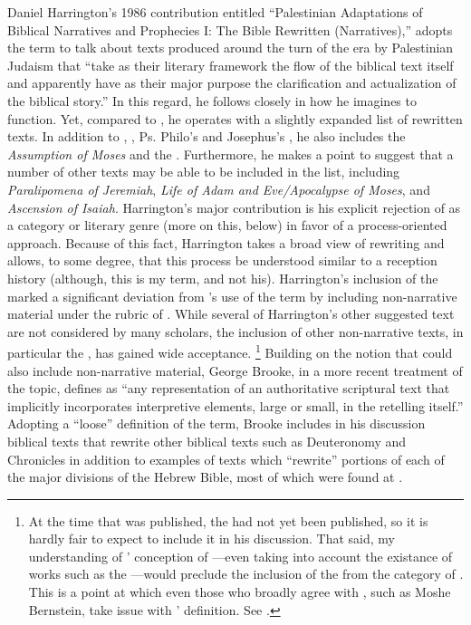 Daniel Harrington's 1986 contribution entitled ``Palestinian Adaptations of Biblical Narratives and Prophecies I: The Bible Rewritten (Narratives),'' adopts the term \rwb to talk about texts produced around the turn of the era by Palestinian Judaism that ``take as their literary framework the flow of the biblical text itself and apparently have as their major purpose the clarification and actualization of the biblical story.''\autocite[239]{harrington_kraft-nickelsburg1986} In this regard, he follows \vermes closely in how he imagines \rwb to function. Yet, compared to \vermes, he operates with a slightly expanded list of rewritten texts. In addition to \jub, \ga, Ps. Philo's \lab and Josephus's \ant, he also includes the \emph{Assumption of Moses} and the \templescroll. Furthermore, he makes a point to suggest that a number of other texts may be able to be included in the list, including \emph{Paralipomena of Jeremiah}, \emph{Life of Adam and Eve/Apocalypse of Moses}, and \emph{Ascension of Isaiah}. Harrington's major contribution is his explicit rejection of \rwb as a category or literary genre (more on this, below) in favor of a process-oriented approach. Because of this fact, Harrington takes a broad view of rewriting and allows, to some degree, that this process be understood similar to a reception history (although, this is my term, and not his). Harrington's inclusion of the \templescroll marked a significant deviation from \vermes's use of the term by including non-narrative material under the rubric of \rwb. While several of Harrington's other suggested text are not considered \rwb by many scholars, the inclusion of other non-narrative texts, in particular the \templescroll, has gained wide acceptance.%
%
\footnote{At the time that  was published, the \templescroll had not yet been published, so it is hardly fair to expect \vermes to include it in his discussion. That said, my understanding of \vermes' conception of \rwb---even taking into account the existance of works such as the \templescroll---would preclude the inclusion of the \templescroll from the category of \rwb. This is a point at which even those who broadly agree with \vermes, such as Moshe Bernstein, take issue with \vermes' definition. See \cite[TODO: pg]{bernstein_textus2005}.}
%
Building on the notion that \rwb could also include non-narrative material, George Brooke, in a more recent treatment of the topic, defines \rwb as ``any representation of an authoritative scriptural text that implicitly incorporates interpretive elements, large or small, in the retelling itself.''\autocite[777]{brooke_schiffman-vanderkam2000} Adopting a ``loose'' definition of the term, Brooke includes in his discussion biblical texts that rewrite other biblical texts such as Deuteronomy and Chronicles in addition to examples of texts which ``rewrite'' portions of each of the major divisions of the Hebrew Bible, most of which were found at \qumran.\autocites[Brooke categorizes the texts as follows: Reworked Pentateuchs, Rewritten Pentateuchal narratives, Rewritten Pentateuchal laws, Rewritten Former Prophets, Rewritten Latter Prophets, and Rewritten Writings.][778--780]{brooke_schiffman-vanderkam2000}[See also][]{brooke_herbert-tov2002} 

